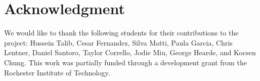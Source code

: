 \documentclass{sig-alternate-05-2015}
\begin{document}
\section*{Acknowledgment}

We would like to thank the following students for their contributions to the project: Hussein Talib, Cesar Fernandez, Silva Matti, Paula Garcia, Chris Lentner, Daniel Santoro, Taylor Corrello, Jodie Miu, George Hearde, and Kocsen Chung. This work was partially funded through a development grant from the Rochester Institute of Technology.



\balance %



\end{document}
